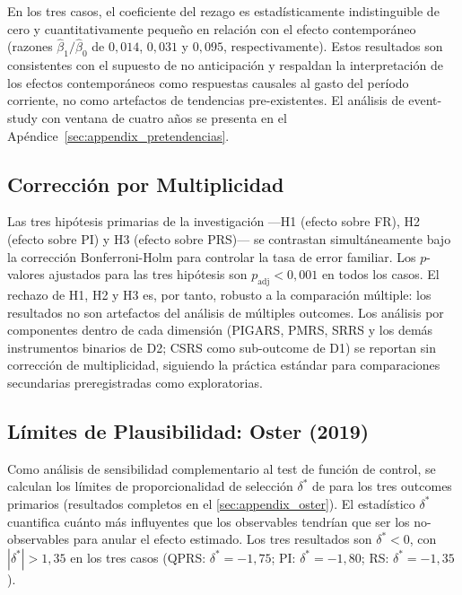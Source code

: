 En los tres casos, el coeficiente del rezago es estadísticamente indistinguible de cero y cuantitativamente pequeño en relación con el efecto contemporáneo (razones $\hat{\beta}_1/\hat{\beta}_0$ de $0{,}014$, $0{,}031$ y $0{,}095$, respectivamente).
Estos resultados son consistentes con el supuesto de no anticipación y respaldan la interpretación de los efectos contemporáneos como respuestas causales al gasto del período corriente, no como artefactos de tendencias pre-existentes.
El análisis de event-study con ventana de cuatro años se presenta en el Apéndice~\ref{sec:appendix_pretendencias}.

\subsection{Corrección por Multiplicidad}
\label{sec:multiplicidad}

Las tres hipótesis primarias de la investigación ---H1 (efecto sobre FR), H2 (efecto sobre PI) y H3 (efecto sobre PRS)--- se contrastan simultáneamente bajo la corrección Bonferroni-Holm para controlar la tasa de error familiar. Los $p$-valores ajustados para las tres hipótesis son $p_{\text{adj}} < 0{,}001$ en todos los casos. El rechazo de H1, H2 y H3 es, por tanto, robusto a la comparación múltiple: los resultados no son artefactos del análisis de múltiples outcomes. Los análisis por componentes dentro de cada dimensión (PIGARS, PMRS, SRRS y los demás instrumentos binarios de D2; CSRS como sub-outcome de D1) se reportan sin corrección de multiplicidad, siguiendo la práctica estándar para comparaciones secundarias preregistradas como exploratorias.

\subsection{Límites de Plausibilidad: Oster (2019)}
\label{sec:oster_resultados}

Como análisis de sensibilidad complementario al test de función de control, se calculan los límites de proporcionalidad de selección $\delta^*$ de \citet{Oster2019} para los tres outcomes primarios (resultados completos en el \cref{sec:appendix_oster}).
El estadístico $\delta^*$ cuantifica cuánto más influyentes que los observables tendrían que ser los no-observables para anular el efecto estimado.
Los tres resultados son $\delta^* < 0$, con $|\delta^*| > 1{,}35$ en los tres casos (QPRS: $\delta^* = -1{,}75$; PI: $\delta^* = -1{,}80$; RS: $\delta^* = -1{,}35$).

